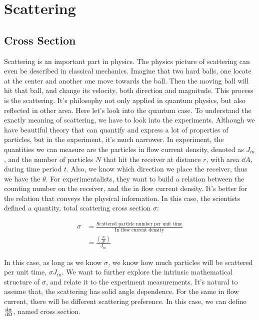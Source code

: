 \documentclass[../main.tex]{subfiles}
\begin{document}
\section{\textbf{Scattering}}

\subsection{Cross Section}

Scattering is an important part in physics. The physics picture of scattering can even be described in classical mechanics. Imagine that two hard balls, one locate at the center and another one move towards the ball. Then the moving ball will hit that ball, and change its velocity, both direction and magnitude. This process is the scattering. It's philosophy not only applied in quantum physics, but also reflected in other area. Here let's look into the quantum case. To understand the exactly meaning of scattering, we have to look into the experiments. Although we have beautiful theory that can quantify and express a lot of properties of particles, but in the experiment, it's much narrower. In experiment, the quantities we can measure are the particles in flow current density, denoted as $J_{in}$, and the number of particles $N$ that hit the receiver at distance $r$, with area $\dd{A}$, during time period $t$. Also, we know which direction we place the receiver, thus we have the $\theta$. For experimentalists, they want to build a relation between the counting number on the receiver, and the in flow current density. It's better for the relation that conveys the physical information. In this case, the scientists defined a quantity, total scattering cross section $\sigma$:

\begin{align}
    \sigma &= \frac{\textrm{Scattered particle number per unit time}}{\textrm{In flow current density}}\nonumber\\
    &= \frac{(\frac{N}{\Delta t})}{J_{in}}
\end{align}

In this case, as long as we know $\sigma$, we know how much particles will be scattered per unit time, $\sigma J_{in}$. We want to further explore the intrinsic mathematical structure of $\sigma$, and relate it to the experiment measurements. It's natural to assume that, the scattering has solid angle dependence. For the same in flow current, there will be different scattering preference. In this case, we can define $\dv{\sigma}{\Omega}$, named cross section.
\end{document}
